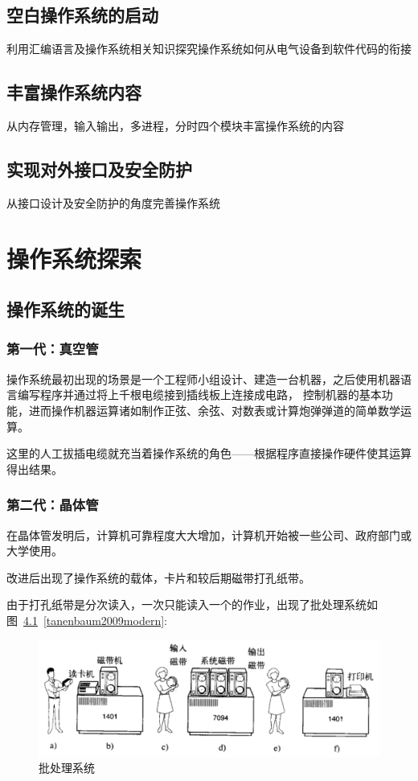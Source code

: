 \documentclass{swfcthesis}
\begin{document}
\section{空白操作系统的启动}
利用汇编语言及操作系统相关知识探究操作系统如何从电气设备到软件代码的衔接

\section{丰富操作系统内容}
从内存管理，输入输出，多进程，分时四个模块丰富操作系统的内容

\section{实现对外接口及安全防护}
从接口设计及安全防护的角度完善操作系统

\chapter{操作系统探索}

\section{操作系统的诞生}

\subsection{第一代：真空管}

操作系统最初出现的场景是一个工程师小组设计、建造一台机器，之后使用机器语言编写程序并通过将上千根电缆接到插线板上连接成电路，
控制机器的基本功能，进而操作机器运算诸如制作正弦、余弦、对数表或计算炮弹弹道的简单数学运算。

这里的人工拔插电缆就充当着操作系统的角色——根据程序直接操作硬件使其运算得出结果。

\subsection{第二代：晶体管}

在晶体管发明后，计算机可靠程度大大增加，计算机开始被一些公司、政府部门或大学使用。

改进后出现了操作系统的载体，卡片和较后期磁带打孔纸带。

由于打孔纸带是分次读入，一次只能读入一个的作业，出现了批处理系统如图~\ref{fig:btss}~\ref{tanenbaum2009modern}: 

\begin{figure}[h]
  \centering
  \includegraphics[width=.8\textwidth]{fig/btss.png}
  \caption{批处理系统}
  \label{fig:btss}
\end{figure}
\end{document}
